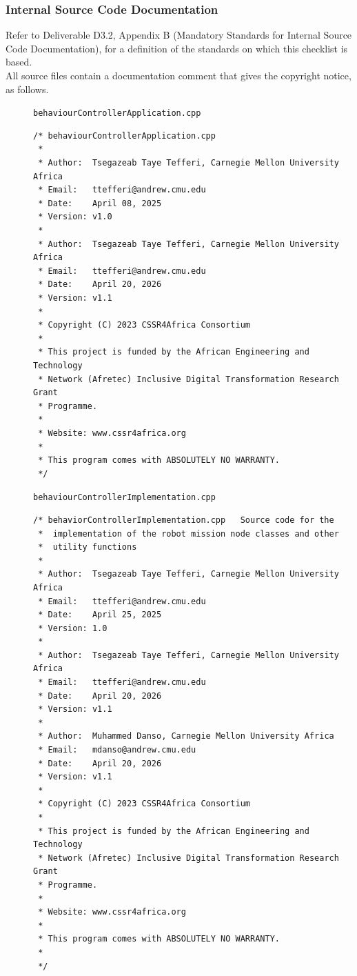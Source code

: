 \documentclass{CSSRforAfrica}
\newcommand{\checkboxChecked}{\fbox{\ding{51}}} %
\begin{document}
 
\subsubsection{Internal Source Code Documentation}
\label{subsubsection:behaviour_controller_documentation_standards}  
 
Refer to Deliverable D3.2, Appendix B (Mandatory Standards for Internal Source Code Documentation), for a definition of the standards on which this checklist is based.\\

\noindent All source files contain a documentation comment that gives the copyright notice, as follows.

\begin{description}

\item[\checkboxChecked] {\small \verb+behaviourControllerApplication.cpp+}  
{\small \begin{verbatim}
/* behaviourControllerApplication.cpp
 *
 * Author:  Tsegazeab Taye Tefferi, Carnegie Mellon University Africa
 * Email:   ttefferi@andrew.cmu.edu
 * Date:    April 08, 2025
 * Version: v1.0
 *
 * Author:  Tsegazeab Taye Tefferi, Carnegie Mellon University Africa
 * Email:   ttefferi@andrew.cmu.edu
 * Date:    April 20, 2026
 * Version: v1.1
 *
 * Copyright (C) 2023 CSSR4Africa Consortium
 * 
 * This project is funded by the African Engineering and Technology
 * Network (Afretec) Inclusive Digital Transformation Research Grant
 * Programme. 
 *
 * Website: www.cssr4africa.org
 *
 * This program comes with ABSOLUTELY NO WARRANTY.
 */
\end{verbatim} }

\item[\checkboxChecked]  {\small \verb+behaviourControllerImplementation.cpp+}  
{\small \begin{verbatim}
/* behaviorControllerImplementation.cpp   Source code for the
 *  implementation of the robot mission node classes and other
 *  utility functions
 *
 * Author:  Tsegazeab Taye Tefferi, Carnegie Mellon University Africa
 * Email:   ttefferi@andrew.cmu.edu
 * Date:    April 25, 2025
 * Version: 1.0
 *
 * Author:  Tsegazeab Taye Tefferi, Carnegie Mellon University Africa
 * Email:   ttefferi@andrew.cmu.edu
 * Date:    April 20, 2026
 * Version: v1.1
 *
 * Author:  Muhammed Danso, Carnegie Mellon University Africa
 * Email:   mdanso@andrew.cmu.edu
 * Date:    April 20, 2026
 * Version: v1.1
 *
 * Copyright (C) 2023 CSSR4Africa Consortium
 *
 * This project is funded by the African Engineering and Technology
 * Network (Afretec) Inclusive Digital Transformation Research Grant
 * Programme.
 *
 * Website: www.cssr4africa.org
 *
 * This program comes with ABSOLUTELY NO WARRANTY.
 *
 */
\end{verbatim} }


\end{description}
\end{document}
